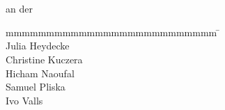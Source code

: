 \begin{titlepage}	
	\centering
	
	{\large \ \par}
	{\scshape\LARGE \reportType \par}	
	\vspace{1.5cm}
	{\huge\bfseries \reportTitle \par}
	\vspace{1.5cm}
	{\large \courseOfStudies \\ an der \university \par}
	\vspace{1cm}
	{\large \byTitle \par}
	{\Large\itshape \authorName \par}
	\vfill
	{\large \reportDate \par}
	\vfill
	\begin{tabbing}
		mmmmmmmmmmmmmmmmmmmmmmmmmm			\= \kill 			%
		\textbf{\timeOfProjectTitle}		\> \timeOfProject \\
		\textbf{\studentIdTitle}			\> Julia Heydecke \\
											\> Christine Kuczera \\
											\> Hicham Naoufal \\
											\> Samuel Pliska\\
											\> Ivo Valls \\
		\textbf{\supervisorTitle}			\> \supervisorName \\		
	\end{tabbing}
\end{titlepage}



